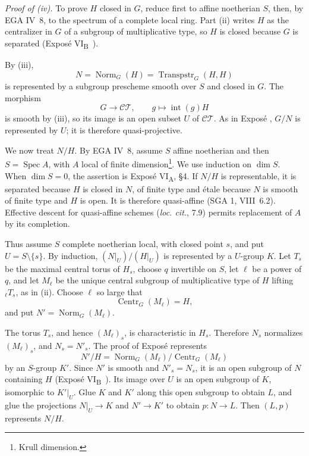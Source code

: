 \medskip\noindent\textit{Proof of (iv).}
To prove \(H\) closed in \(G\), reduce first to affine noetherian
\(S\), then, by EGA IV~8, to the spectrum of a complete local ring.
Part (ii) writes \(H\) as the centralizer in \(G\) of a subgroup of
multiplicative type, so \(H\) is closed because \(G\) is separated
(Exposé VI\textsubscript{B}~).

By (iii),
\[
 N=\operatorname{Norm}_G(H)
  =\operatorname{Transpstr}_G(H,H)
\]
is represented by a subgroup prescheme smooth over \(S\) and closed
in \(G\). The morphism
\[
  G\longrightarrow\mathcal{CT},
  \qquad g\longmapsto\operatorname{int}(g)H
\]
is smooth by (iii), so its image is an open subset \(U\) of
\(\mathcal{CT}\). As in Exposé , \(G/N\) is represented by
\(U\); it is therefore quasi-projective.

We now treat \(N/H\). By EGA IV~8, assume \(S\) affine noetherian and
then \(S=\operatorname{Spec}A\), with \(A\) local of finite
dimension\footnote{Krull dimension.}. We use induction on
\(\dim S\). When \(\dim S=0\), the assertion is Exposé
VI\textsubscript{A}, §4. If \(N/H\) is representable, it is separated
because \(H\) is closed in \(N\), of finite type and étale because
\(N\) is smooth of finite type and \(H\) is open. It is therefore
quasi-affine (SGA 1, VIII~6.2). Effective descent for quasi-affine
schemes (\emph{loc. cit.}, 7.9) permits replacement of \(A\) by its
completion.

Thus assume \(S\) complete noetherian local, with closed point \(s\),
and put \(U=S\setminus\{s\}\). By induction,
\((N|_U)/(H|_U)\) is represented by a \(U\)-group \(K\). Let \(T_s\)
be the maximal central torus of \(H_s\), choose \(q\) invertible on
\(S\), let \(\ell\) be a power of \(q\), and let \(M_\ell\) be the
unique central subgroup of multiplicative type of \(H\) lifting
\({}_\ell T_s\), as in (ii). Choose \(\ell\) so large that
\[
  \operatorname{Centr}_G(M_\ell)=H,
\]
and put \(N'=\operatorname{Norm}_G(M_\ell)\).

The torus \(T_s\), and hence \((M_\ell)_s\), is characteristic in
\(H_s\). Therefore \(N_s\) normalizes \((M_\ell)_s\), and
\(N_s=N'_s\). The proof of Exposé  represents
\[
  N'/H
  =\operatorname{Norm}_G(M_\ell)/
   \operatorname{Centr}_G(M_\ell)
\]
by an \(S\)-group \(K'\). Since \(N'\) is smooth and
\(N'_s=N_s\), it is an open subgroup of \(N\) containing \(H\)
(Exposé VI\textsubscript{B}~). Its image over \(U\) is an open
subgroup of \(K\), isomorphic to \(K'|_U\). Glue \(K\) and \(K'\)
along this open subgroup to obtain \(L\), and glue the projections
\(N|_U\to K\) and \(N'\to K'\) to obtain \(p:N\to L\). Then
\((L,p)\) represents \(N/H\).

